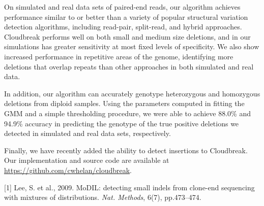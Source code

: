 \documentclass[11pt,a4paper]{article}
\begin{document}
On simulated and real data sets of paired-end reads, our algorithm achieves performance
similar to or better than a variety of popular structural variation
detection algorithms, including read-pair, split-read, and hybrid
approaches. Cloudbreak performs well on both small and medium size
deletions, and in our simulations has greater sensitivity at most fixed levels of
specificity. We also show increased performance
in repetitive areas of the genome, identifying more deletions that
overlap repeats than other approaches in both simulated and real data.

In addition, our algorithm can accurately genotype heterozygous and
homozygous deletions from diploid samples. Using the parameters
computed in fitting the GMM and a simple thresholding procedure, we were able to achieve 88.0\% and 94.9\% accuracy in predicting the genotype of the true positive deletions we detected in simulated and real data sets, respectively.

Finally, we have recently added the ability to detect insertions to
Cloudbreak. Our implementation and source code are available at \url{https://github.com/cwhelan/cloudbreak}.

[1] Lee, S. et al., 2009. MoDIL: detecting small indels from clone-end
sequencing with mixtures of distributions. {\it Nat. Methods}, 6(7), pp.473–474.
\end{document}
